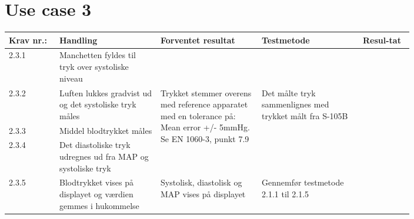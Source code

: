 	\pagebreak
	\section{Use case 3}
				\begin{longtable}{|p{0.1\linewidth}|p{0.2\linewidth}|p{0.2\linewidth}|p{0.2\linewidth}|p{0.1\linewidth}|}
					\hline
					Krav nr.: & Handling & Forventet resultat & Testmetode & Resul-tat  \\\hline
					2.3.1 & Manchetten fyldes til tryk over systoliske niveau & & &  \\ \hline
					2.3.2 & Luften lukkes gradvist ud og det systoliske tryk måles & \multirow{3}{\linewidth}{Trykket stemmer overens med reference apparatet med en tolerance på: Mean error +/- 5mmHg. Se EN 1060-3, punkt 7.9} & \multirow{3}{\linewidth}{Det målte tryk sammenlignes med trykket målt fra S-105B} & \multirow{3}{\linewidth}{}  \\ \cline{1-2} 
					2.3.3 & Middel blodtrykket måles & & & \\ \cline{1-2} 
					2.3.4 &  Det diastoliske tryk udregnes ud fra MAP og systoliske tryk  & & & \\ \hline
					2.3.5 & Blodtrykket vises på displayet og værdien gemmes i hukommelse & Systolisk, diastolisk og MAP vises på displayet & Gennemfør testmetode 2.1.1 til 2.1.5 & \\ \hline
				\end{longtable}